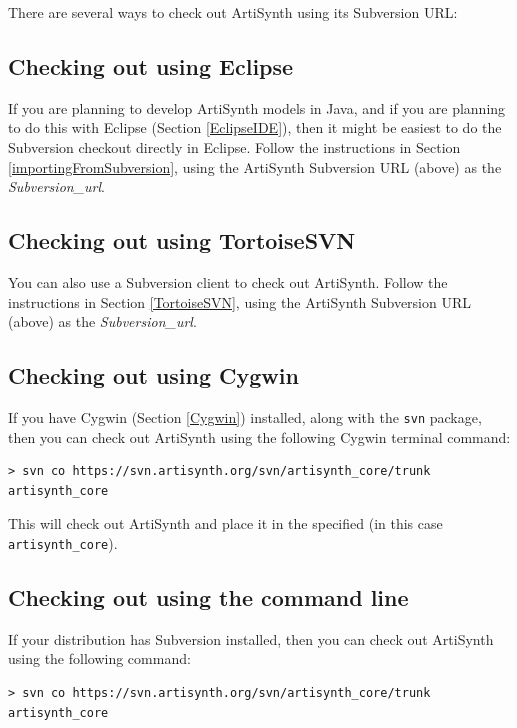 There are several ways to check out ArtiSynth using its Subversion URL:

\subsection{Checking out using Eclipse}
\label{ArtiSynthEclipseCheckout}

If you are planning to develop ArtiSynth models in Java, and if you
are planning to do this with Eclipse (Section \ref{EclipseIDE}), then
it might be easiest to do the Subversion checkout directly in Eclipse.
Follow the instructions in Section \ref{importingFromSubversion},
using the ArtiSynth Subversion URL (above) as the {\it
Subversion\_url}.

\ifWindows
\subsection{Checking out using TortoiseSVN}
\label{TortoiseSVNCheckout}

You can also use a Subversion client to check out ArtiSynth. Follow
the instructions in Section \ref{TortoiseSVN}, using the ArtiSynth
Subversion URL (above) as the {\it Subversion\_url}.

\subsection{Checking out using Cygwin}
\label{ArtiSynthCygwinCheckout}

If you have Cygwin (Section \ref{Cygwin}) installed, along
with the {\tt svn} package, then you can check out ArtiSynth using the
following Cygwin terminal command:

\begin{lstlisting}[]
> svn co https://svn.artisynth.org/svn/artisynth_core/trunk artisynth_core
\end{lstlisting}

This will check out ArtiSynth and place it in the specified \directory 
(in this case {\tt artisynth\_core}).
\else
\subsection{Checking out using the command line}
\label{ArtiSynthCygwinCheckout}

If your \SYSTEM distribution has Subversion installed, then you can
check out ArtiSynth using the following command:

\begin{lstlisting}[]
> svn co https://svn.artisynth.org/svn/artisynth_core/trunk artisynth_core
\end{lstlisting}

